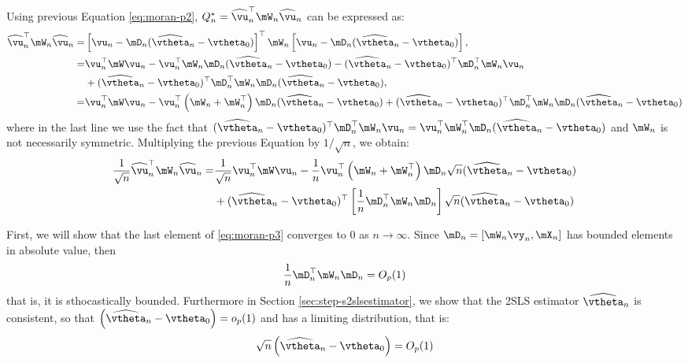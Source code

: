 \documentclass[english,12pt]{book}\usepackage[]{graphicx}\usepackage[]{xcolor}
\begin{document}
\begin{subappendices}
Using previous Equation \eqref{eq:moran-p2}, $Q_n^* = \widehat{\vu}_n^\top\mW_n\widehat{\vu}_n$ can be expressed as:
\begin{equation*}
\begin{aligned}
  \widehat{\vu}_n^\top\mW_n\widehat{\vu}_n  = & \left[\vu_n - \mD_n(\widehat{\vtheta}_n - \vtheta_0)\right]^\top\mW_n\left[\vu_n - \mD_n(\widehat{\vtheta}_n - \vtheta_0)\right], \\
   = &\vu_n^\top\mW\vu_n - \vu_n^\top\mW_n\mD_n(\widehat{\vtheta}_n - \vtheta_0)-(\widehat{\vtheta}_n - \vtheta_0)^\top\mD_n^\top\mW_n\vu_n  \\
  & +(\widehat{\vtheta}_n - \vtheta_0)^\top\mD_n^\top\mW_n\mD_n(\widehat{\vtheta}_n - \vtheta_0), \\
   = & \vu_n^\top\mW\vu_n - \vu_n^\top\left(\mW_n + \mW_n^\top\right)\mD_n(\widehat{\vtheta}_n - \vtheta_0)+(\widehat{\vtheta}_n - \vtheta_0)^\top\mD_n^\top\mW_n\mD_n(\widehat{\vtheta}_n - \vtheta_0)
\end{aligned}
\end{equation*}
%
where in the last line we use the fact that $(\widehat{\vtheta}_n - \vtheta_0)^\top\mD_n^\top\mW_n\vu_n=\vu_n^\top\mW_n^\top\mD_n(\widehat{\vtheta}_n - \vtheta_0)$ and $\mW_n$ is not necessarily symmetric. Multiplying the previous Equation by $1/\sqrt{n}$, we obtain:
\begin{equation}\label{eq:moran-p3}
\begin{aligned}
\frac{1}{\sqrt{n}}\widehat{\vu}_n^\top\mW_n\widehat{\vu}_n= &  \frac{1}{\sqrt{n}}\vu_n^\top\mW\vu_n - \frac{1}{n}\vu_n^\top\left(\mW_n + \mW_n^\top\right)\mD_n\sqrt{n}(\widehat{\vtheta}_n - \vtheta_0) \\
& +(\widehat{\vtheta}_n - \vtheta_0)^\top\left[\frac{1}{n}\mD_n^\top\mW_n\mD_n\right]\sqrt{n}(\widehat{\vtheta}_n - \vtheta_0)
\end{aligned}
\end{equation}

First, we will show that the last element of \eqref{eq:moran-p3} converges to 0 as $n\to \infty$. Since $\mD_n = \left[\mW_n\vy_n, \mX_n\right]$ has bounded elements in absolute value, then 
\begin{equation*}
\frac{1}{n}\mD_n^\top\mW_n\mD_n = O_p(1)
\end{equation*}
%
that is, it is sthocastically bounded. Furthermore in Section \ref{sec:step-s2slsestimator}, we show that the 2SLS estimator $\widehat{\vtheta}_n$ is consistent, so that $\left(\widehat{\vtheta}_n - \vtheta_0\right) = o_p(1)$ and has a limiting distribution, that is:
\begin{equation*}
\sqrt{n}\left(\widehat{\vtheta}_n - \vtheta_0\right) = O_p(1)
\end{equation*}


\end{subappendices}
\end{document}
